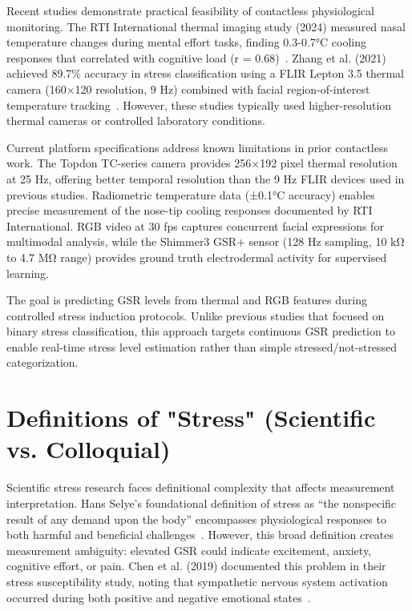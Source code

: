 Recent studies demonstrate practical feasibility of contactless physiological monitoring. The RTI International thermal imaging study (2024) measured nasal temperature changes during mental effort tasks, finding 0.3-0.7°C cooling responses that correlated with cognitive load (r = 0.68)~\cite{rti2025thermal}. Zhang et al. (2021) achieved 89.7\% accuracy in stress classification using a FLIR Lepton 3.5 thermal camera (160×120 resolution, 9 Hz) combined with facial region-of-interest temperature tracking~\cite{zhang2021human}. However, these studies typically used higher-resolution thermal cameras or controlled laboratory conditions.

Current platform specifications address known limitations in prior contactless work. The Topdon TC-series camera provides 256×192 pixel thermal resolution at 25 Hz, offering better temporal resolution than the 9 Hz FLIR devices used in previous studies. Radiometric temperature data (±0.1°C accuracy) enables precise measurement of the nose-tip cooling responses documented by RTI International. RGB video at 30 fps captures concurrent facial expressions for multimodal analysis, while the Shimmer3 GSR+ sensor (128 Hz sampling, 10 kΩ to 4.7 MΩ range) provides ground truth electrodermal activity for supervised learning.

The goal is predicting GSR levels from thermal and RGB features during controlled stress induction protocols. Unlike previous studies that focused on binary stress classification, this approach targets continuous GSR prediction to enable real-time stress level estimation rather than simple stressed/not-stressed categorization.

\section{Definitions of "Stress" (Scientific vs. Colloquial)}

Scientific stress research faces definitional complexity that affects measurement interpretation. Hans Selye's foundational definition of stress as ``the nonspecific result of any demand upon the body'' encompasses physiological responses to both harmful and beneficial challenges~\cite{selye1974stress}. However, this broad definition creates measurement ambiguity: elevated GSR could indicate excitement, anxiety, cognitive effort, or pain. Chen et al. (2019) documented this problem in their stress susceptibility study, noting that sympathetic nervous system activation occurred during both positive and negative emotional states~\cite{chen2019neural}.

